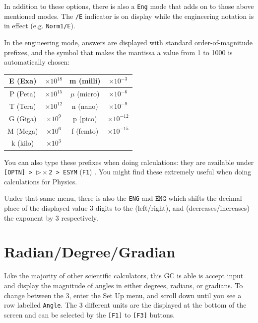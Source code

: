 \documentclass[a5paper]{memoir}
\def\code#1{\texttt{#1}}
\def\Fone{(\code{F1}) }
\begin{document}
In addition to these options, there is also a \code{Eng} mode that adds on to those above mentioned modes. The \code{/E} indicator is on display while the engineering notation is in effect (e.g. \code{Norm1/E}). 

In the engineering mode, answers are displayed with standard order-of-magnitude prefixes, and the symbol that makes the mantissa a value from 1 to 1000 is automatically chosen:
\begin{center}
	\renewcommand{\arraystretch}{1.3}
	\begin{tabular}{|c|c||c|c|}
		\hline
		E (Exa)		& $\times10^{18}$	& m (milli)	& $\times10^{-3}$ \\
		\hline
		P (Peta)	& $\times10^{15}$	& $\mu$ (micro)	& $\times10^{-6}$ \\
		\hline
		T (Tera)	& $\times10^{12}$	& n (nano)	& $\times10^{-9}$ \\
		\hline
		G (Giga)	& $\times10^{9}$	& p (pico)	& $\times10^{-12}$ \\
		\hline
		M (Mega)	& $\times10^{6}$	& f (femto)	& $\times10^{-15}$ \\
		\hline
		k (kilo)	& $\times10^3$		& 	&  \\
		\hline
	\end{tabular}
\end{center}

You can also type these prefixes when doing calculations: they are available under \code{[OPTN] > $\triangleright\times$2 > ESYM} \Fone. You might find these extremely useful when doing calculations for Physics.

Under that same menu, there is also the \code{ENG} and $\overleftarrow{\texttt{ENG}}$ which shifts the decimal place of the displayed value 3 digits to the (left/right), and (decreases/increases) the exponent by 3 respectively.

\section{Radian/Degree/Gradian} \label{sec:angleunits}

Like the majority of other scientific calculators, this GC is able is accept input and display the magnitude of angles in either degrees, radians, or gradians. To change between the 3, enter the Set Up menu, and scroll down until you see a row labelled \code{Angle}. The 3 different units are the displayed at the bottom of the screen and can be selected by the \code{[F1]} to \code{[F3]} buttons.
\end{document}

